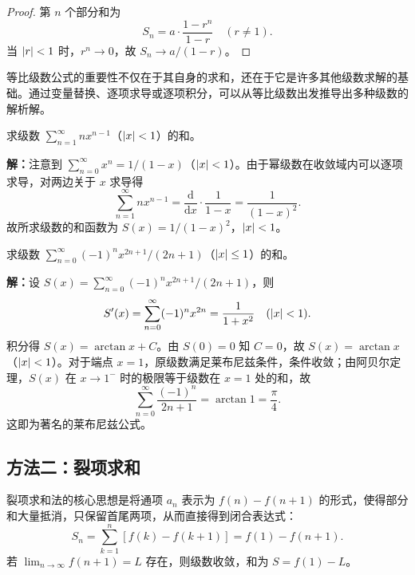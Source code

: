 \begin{proof}
第 $n$ 个部分和为
\begin{equation}
S_n = a \cdot \frac{1 - r^n}{1 - r} \quad (r \neq 1).
\end{equation}
当 $\left|r\right| < 1$ 时，$r^n \to 0$，故 $S_n \to a/(1-r)$。
\end{proof}

等比级数公式的重要性不仅在于其自身的求和，还在于它是许多其他级数求解的基础。通过变量替换、逐项求导或逐项积分，可以从等比级数出发推导出多种级数的解析解。

\begin{example}[含参数的等比级数变形]
求级数 $\displaystyle \sum_{n=1}^{\infty} n x^{n-1}$（$\left|x\right| < 1$）的和。

\textbf{解：}注意到 $\displaystyle \sum_{n=0}^{\infty} x^n = 1/(1-x)$（$\left|x\right| < 1$）。由于幂级数在收敛域内可以逐项求导，对两边关于 $x$ 求导得
\begin{equation}
\sum_{n=1}^{\infty} n x^{n-1} = \frac{\mathrm{d}}{\mathrm{d}x} \cdot \frac{1}{1-x} = \frac{1}{(1-x)^2}.
\end{equation}
故所求级数的和函数为 $S(x) = 1/(1-x)^2$，$\left|x\right| < 1$。
\end{example}

\begin{example}[等比级数的积分变形]
求级数 $\displaystyle \sum_{n=0}^{\infty} (-1)^n x^{2n+1}/(2n+1)$（$\left|x\right| \leq 1$）的和。

\textbf{解：}设 $\displaystyle S(x) = \sum_{n=0}^{\infty} (-1)^n x^{2n+1}/(2n+1)$，则
\begin{equation}
S'(x) = \sum_{n=0}^{\infty} (-1)^n x^{2n} = \frac{1}{1+x^2} \quad (\left|x\right| < 1).
\end{equation}
积分得 $S(x) = \arctan x + C$。由 $S(0) = 0$ 知 $C = 0$，故 $S(x) = \arctan x$（$\left|x\right| < 1$）。对于端点 $x = 1$，原级数满足莱布尼兹条件，条件收敛；由阿贝尔定理，$S(x)$ 在 $x \to 1^-$ 时的极限等于级数在 $x=1$ 处的和，故
\begin{equation}
\sum_{n=0}^{\infty} \frac{(-1)^n}{2n+1} = \arctan 1 = \frac{\pi}{4}.
\end{equation}
这即为著名的莱布尼兹公式。
\end{example}

\subsection{方法二：裂项求和}

裂项求和法的核心思想是将通项 $a_n$ 表示为 $f(n) - f(n+1)$ 的形式，使得部分和大量抵消，只保留首尾两项，从而直接得到闭合表达式：
\begin{equation}
S_n = \sum_{k=1}^{n} [f(k) - f(k+1)] = f(1) - f(n+1).
\end{equation}
若 $\displaystyle \lim_{n \to \infty} f(n+1) = L$ 存在，则级数收敛，和为 $S = f(1) - L$。

